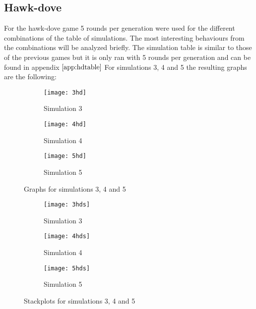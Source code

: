 \subsection{Hawk-dove}
For the hawk-dove game 5 rounds per generation were used for the different combinations of the table of simulations. The most interesting behaviours from the combinations will be analyzed briefly. The simulation table is similar to those of the previous games but it is only ran with 5 rounds per generation and can be found in appendix $\ref{app:hdtable}$
For simulations 3, 4 and 5 the resulting graphs are the following:

\begin{figure}[H]       
    \centering
    \begin{subfigure}[b]{0.3\textwidth}
	\centering
	{\texttt{[image: 3hd]}}   
    	\caption{Simulation 3}
	\label{fig:hd3}
    \end{subfigure}
    \hfill
    \begin{subfigure}[b]{0.3\textwidth}
	\centering
	{\texttt{[image: 4hd]}}   
    	\caption{Simulation 4}
	\label{fig:hd4}
    \end{subfigure}
    \hfill
    \begin{subfigure}[b]{0.3\textwidth}
	\centering
	{\texttt{[image: 5hd]}}   
    	\caption{Simulation 5}
	\label{fig:hd5}
    \end{subfigure}
    \caption{Graphs for simulations 3, 4 and 5}
    \label{hdsim345}
\end{figure}
\begin{figure}[H]       
    \centering
    \begin{subfigure}[b]{0.3\textwidth}
	\centering
	{\texttt{[image: 3hds]}}   
    	\caption{Simulation 3}
	\label{fig:hd3s}
    \end{subfigure}
    \hfill
    \begin{subfigure}[b]{0.3\textwidth}
	\centering
	{\texttt{[image: 4hds]}}   
    	\caption{Simulation 4}
	\label{fig:hd4s}
    \end{subfigure}
    \hfill
    \begin{subfigure}[b]{0.3\textwidth}
	\centering
	{\texttt{[image: 5hds]}}   
    	\caption{Simulation 5}
	\label{fig:hd5s}
    \end{subfigure}
    \caption{Stackplots for simulations 3, 4 and 5}
    \label{hdsim345s}
\end{figure}

